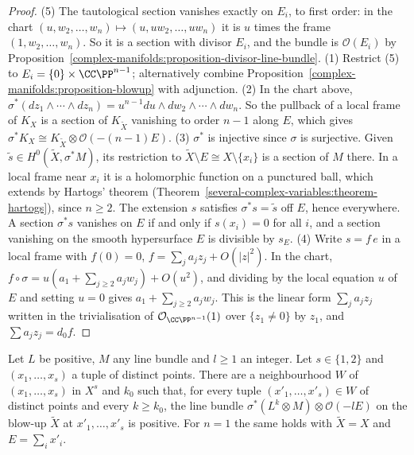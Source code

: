 \begin{proof}
(5) The tautological section vanishes exactly on $E_i$, to first order: in the chart $(u, w_2, \ldots, w_n) \mapsto (u, uw_2, \ldots, uw_n)$ it is $u$
times the frame $(1, w_2, \ldots, w_n)$. So it is a section with divisor $E_i$, and the bundle is $\mathcal{O}(E_i)$ by
Proposition~\ref{complex-manifolds:proposition-divisor-line-bundle}. (1) Restrict (5) to $E_i = \{0\} \times \CC\PP^{n-1}$; alternatively
combine Proposition~\ref{complex-manifolds:proposition-blowup} with adjunction. (2) In the chart above,
$\sigma^*(dz_1 \wedge \cdots \wedge dz_n) = u^{n-1}du \wedge dw_2 \wedge \cdots \wedge dw_n$. So the pullback of a local frame of $K_X$ is a section of
$K_{\tilde X}$ vanishing to order $n - 1$ along $E$, which gives $\sigma^*K_X \cong K_{\tilde X} \otimes \mathcal{O}(-(n-1)E)$. (3) $\sigma^*$ is
injective since $\sigma$ is surjective. Given $\tilde s \in H^0(\tilde X, \sigma^*M)$, its restriction to $\tilde X \setminus E \cong X \setminus \{x_i\}$ is
a section of $M$ there. In a local frame near $x_i$ it is a holomorphic function on a punctured ball, which extends by Hartogs' theorem
(Theorem~\ref{several-complex-variables:theorem-hartogs}), since $n \geq 2$. The extension $s$ satisfies $\sigma^*s = \tilde s$ off $E$, hence
everywhere. A section $\sigma^*s$ vanishes on $E$ if and only if $s(x_i) = 0$ for all $i$, and a section vanishing on the smooth hypersurface $E$ is
divisible by $s_E$. (4) Write $s = f\,e$ in a local frame with $f(0) = 0$, $f = \sum_ja_jz_j + O(|z|^2)$. In the chart,
$f \circ \sigma = u(a_1 + \sum_{j \geq 2}a_jw_j) + O(u^2)$, and dividing by the local equation $u$ of $E$ and setting $u = 0$ gives
$a_1 + \sum_{j \geq 2}a_jw_j$. This is the linear form $\sum_ja_jz_j$ written in the trivialisation of $\mathcal{O}_{\CC\PP^{n-1}}(1)$ over
$\{z_1 \neq 0\}$ by $z_1$, and $\sum a_jz_j = d_0f$.
\end{proof}

\begin{lemma}\label{kodaira:lemma-positivity-blowup}
Let $L$ be positive, $M$ any line bundle and $l \geq 1$ an integer. Let $s \in \{1, 2\}$ and $(x_1, \ldots, x_s)$ a tuple of distinct points. There
are a neighbourhood $W$ of $(x_1, \ldots, x_s)$ in $X^s$ and $k_0$ such that, for every tuple $(x'_1, \ldots, x'_s) \in W$ of distinct points and
every $k \geq k_0$, the line bundle $\sigma^*(L^k \otimes M) \otimes \mathcal{O}(-lE)$ on the blow-up $\tilde X$ at $x'_1, \ldots, x'_s$ is positive.
For $n = 1$ the same holds with $\tilde X = X$ and $E = \sum_ix'_i$.
\end{lemma}

